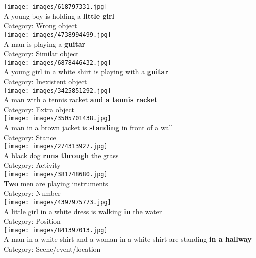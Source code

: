 \documentclass[11pt,a4paper]{article}
\begin{document}
\begin{multicols}{2}
\texttt{[image: images/618797331.jpg]}\\
A young boy is holding a \textbf{little girl}\\
Category: Wrong object\\[3ex]

\texttt{[image: images/4738994499.jpg]}\\
A man is playing a \textbf{guitar}\\
Category: Similar object\\[3ex]

\texttt{[image: images/6878446432.jpg]}\\
A young girl in a white shirt is playing with a \textbf{guitar}\\ 
Category: Inexistent object\\[3ex]

\texttt{[image: images/3425851292.jpg]}\\
A man with a tennis racket \textbf{and a tennis racket}\\ 
Category: Extra object\\[3ex]

\texttt{[image: images/3505701438.jpg]}\\
A man in a brown jacket is \textbf{standing} in front of a wall\\ 
Category: Stance\\[3ex]

\texttt{[image: images/274313927.jpg]}\\
A black dog \textbf{runs through} the grass\\ 
Category: Activity\\[3ex]

\texttt{[image: images/381748680.jpg]}\\
\textbf{Two} men are playing instruments\\
Category: Number\\[3ex]

\texttt{[image: images/4397975773.jpg]}\\
A little girl in a white dress is walking \textbf{in} the water\\ 
Category: Position\\[3ex]

\texttt{[image: images/841397013.jpg]}\\
A man in a white shirt and a woman in a white shirt are standing \textbf{in a hallway}\\ 
Category: Scene/event/location\\[3ex]


\end{multicols}
\end{document}
